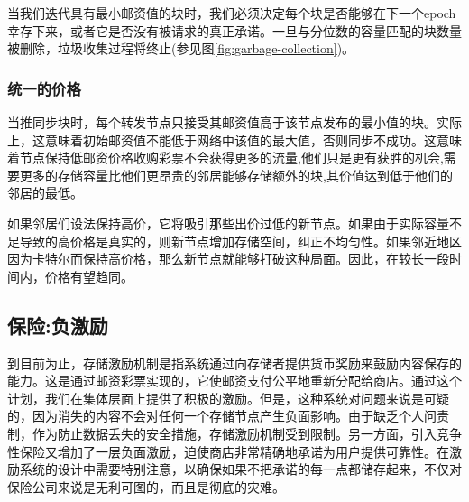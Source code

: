 

当我们迭代具有最小邮资值的块时，我们必须决定每个块是否能够在下一个epoch幸存下来，或者它是否没有被请求的真正承诺。一旦与分位数的容量匹配的块数量被删除，垃圾收集过程将终止(参见图\ref{fig:garbage-collection})。

\subsubsection{统一的价格} 

当推同步块时，每个转发节点只接受其邮资值高于该节点发布的最小值的块。实际上，这意味着初始邮资值不能低于网络中该值的最大值，否则同步不成功。这意味着节点保持低邮资价格收购彩票不会获得更多的流量,他们只是更有获胜的机会,需要更多的存储容量比他们更昂贵的邻居能够存储额外的块,其价值达到低于他们的邻居的最低。

如果邻居们设法保持高价，它将吸引那些出价过低的新节点。如果由于实际容量不足导致的高价格是真实的，则新节点增加存储空间，纠正不均匀性。如果邻近地区因为卡特尔而保持高价格，那么新节点就能够打破这种局面。因此，在较长一段时间内，价格有望趋同。








\subsection{保险:负激励\statusorange}\label{sec:chunk-insurance}


到目前为止，存储激励机制是指系统通过向存储者提供货币奖励来鼓励内容保存的能力。这是通过邮资彩票实现的，它使邮资支付公平地重新分配给商店。通过这个计划，我们在集体层面上提供了积极的激励。但是，这种系统对问题来说是可疑的，因为消失的内容不会对任何一个存储节点产生负面影响。由于缺乏个人问责制，作为防止数据丢失的安全措施，存储激励机制受到限制。另一方面，引入竞争性保险又增加了一层负面激励，迫使商店非常精确地承诺为用户提供可靠性。在激励系统的设计中需要特别注意，以确保如果不把承诺的每一点都储存起来，不仅对保险公司来说是无利可图的，而且是彻底的灾难。 

